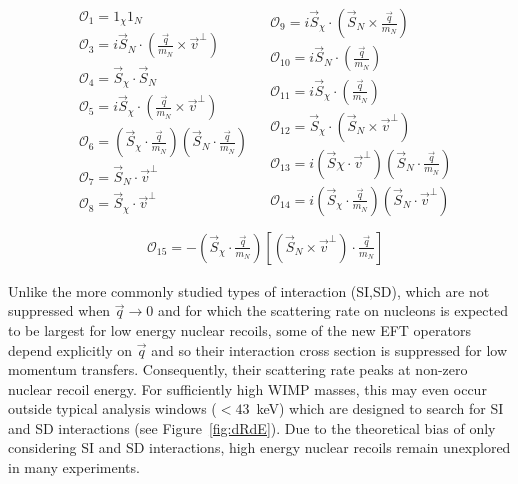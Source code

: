 \begingroup
\belowdisplayskip=0pt
\begin{align*}
\begin{split} 
&\mathcal{O}_1 = 1_{\chi} 1_N  \\
&\mathcal{O}_3 = i\vec{S}_N\cdot (\frac{\vec{q}}{m_N}\times\vec{v}^\perp) \\
&\mathcal{O}_4 = \vec{S}_{\chi}\cdot \vec{S}_N \\
&\mathcal{O}_5 = i\vec{S}_{\chi}\cdot (\frac{\vec{q}}{m_N}\times\vec{v}^\perp) \\
&\mathcal{O}_6 = (\vec{S}_{\chi} \cdot \frac{\vec{q}}{m_N})(\vec{S}_N \cdot \frac{\vec{q}}{m_N}) \\
&\mathcal{O}_7 = \vec{S}_N \cdot \vec{v}^\perp \\
&\mathcal{O}_8 = \vec{S}_{\chi} \cdot \vec{v}^\perp  \\
\end{split}
\begin{split}
&\mathcal{O}_9 = i\vec{S}_{\chi} \cdot(\vec{S}_N \times \frac{\vec{q}}{m_N}) \\
&\mathcal{O}_{10} = i\vec{S}_N \cdot (\frac{\vec{q}}{m_N}) \\
&\mathcal{O}_{11} = i\vec{S}_{\chi} \cdot (\frac{\vec{q}}{m_N}) \\
&\mathcal{O}_{12} = \vec{S}_\chi \cdot (\vec{S}_N \times \vec{v}^\perp) \\
&\mathcal{O}_{13} = i(\vec{S}\chi \cdot \vec{v}^\perp)(\vec{S}_N \cdot \frac{\vec{q}}{m_N})\\
&\mathcal{O}_{14} = i(\vec{S}_\chi \cdot \frac{\vec{q}}{m_N})(\vec{S}_N \cdot \vec{v}^\perp) \\
\end{split}
\end{align*}
\endgroup
\begingroup
\abovedisplayskip=0pt
\begin{align}
&\mathcal{O}_{15} = -(\vec{S}_\chi \cdot \frac{\vec{q}}{m_N})\left[(\vec{S}_N \times \vec{v}^\perp)\cdot \frac{\vec{q}}{m_N}\right]
\label{eq:OpDef}
\end{align}
\endgroup

	    Unlike the more commonly studied types of interaction (SI,SD), which are not suppressed when $\vec{q} \rightarrow 0$ and for which the scattering rate on nucleons is expected to be largest for low energy nuclear recoils, some of the new EFT operators depend explicitly on $\vec{q}$ and so their interaction cross section is suppressed for low momentum transfers. Consequently, their scattering rate peaks at non-zero nuclear recoil energy. For sufficiently high WIMP masses, this may even occur outside typical analysis windows ($< 43$~keV) which are designed to search for SI and SD interactions (see Figure~\ref{fig:dRdE}). Due to the theoretical bias of only considering SI and SD interactions, high energy nuclear recoils remain unexplored in many experiments.
	    
